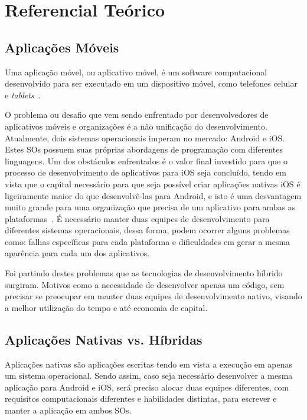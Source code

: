 

\chapter{Referencial Teórico}\label{ch:referencial_teorico}


\section{Aplicações Móveis}\label{sec:aplicacoes-moveis}
Uma aplicação móvel, ou aplicativo móvel, é um software computacional desenvolvido para ser executado em um dispositivo móvel, como telefones celular e \textit{tablets}~\cite{clow2019flutter}.


O problema ou desafio que vem sendo enfrentado por desenvolvedores de aplicativos móveis e organizações é a não unificação do desenvolvimento.
Atualmente, dois sistemas operacionais imperam no mercado: Android e iOS. Estes SOs possuem suas próprias abordagens de programação com diferentes linguagens.
Um dos obstáculos enfrentados é o valor final investido para que o processo de desenvolvimento de aplicativos para iOS seja concluído, tendo em vista que o capital necessário para que seja possível criar aplicações nativas iOS é ligeiramente maior do que desenvolvê-las para Android, e isto é uma desvantagem muito grande para uma organização que precisa de um aplicativo para ambas as plataformas~\cite{goadrich2011smart}.
É necessário manter duas equipes de desenvolvimento para diferentes sistemas operacionais, dessa forma, podem ocorrer alguns problemas como: falhas específicas para cada plataforma e dificuldades em gerar a mesma aparência para cada um dos aplicativos\cite{clow2019flutter}.


Foi partindo destes problemas que as tecnologias de desenvolvimento híbrido surgiram.
Motivos como a necessidade de desenvolver apenas um código, sem precisar se preocupar em manter duas equipes de desenvolvimento nativo, visando a melhor utilização do tempo e até economia de capital\cite{yatsenko2019comparative}{}.


\section{Aplicações Nativas vs. Híbridas}\label{sec:aplicacoes-nativas-vs.-hibridas}
Aplicações nativas são aplicações escritas tendo em vista a execução em apenas um sistema operacional\cite{clow2019flutter}.
Sendo assim, caso seja necessário desenvolver a mesma aplicação para Android e iOS, será preciso alocar duas equipes diferentes, com requisitos computacionais diferentes e habilidades distintas, para escrever e manter a aplicação em ambos SOs.

